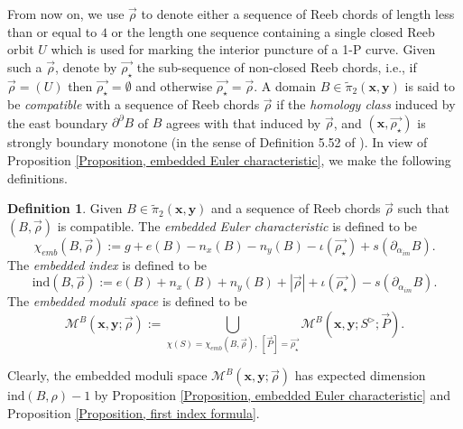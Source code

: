 \documentclass{amsart}
\theoremstyle{definition}
\newtheorem{defn}[thm]{Definition}
\theoremstyle{remark}
\numberwithin{equation}{section}
\numberwithin{equation}{section} \makeatletter
\begin{document}
From now on, we use $\overrightarrow{\rho}$ to denote either a sequence of Reeb chords of length less than or equal to $4$ or the length one sequence containing a single closed Reeb orbit $U$ which is used for marking the interior puncture of a 1-P curve. Given such a $\overrightarrow{\rho}$, denote by $\overrightarrow{{\rho}_{\star}}$ the sub-sequence of non-closed Reeb chords, i.e., if $\overrightarrow{\rho}=(U)$ then $\overrightarrow{{\rho}_{\star}}=\emptyset$ and otherwise $\overrightarrow{{\rho}_{\star}} = \overrightarrow{\rho}$.  
A domain $B\in\tilde{\pi}_2(\bm{x},\bm{y})$ is said to be \emph{compatible} with a sequence of Reeb chords $\overrightarrow{\rho}$ if the \emph{homology class} induced by the east boundary $\partial^\partial B$ of $B$ agrees with that induced by $\overrightarrow{\rho}$, and $(\bm{x},\overrightarrow{{\rho}_{\star}})$ is strongly boundary monotone (in the sense of Definition 5.52 of \cite{LOT18}). In view of Proposition \ref{Proposition, embedded Euler characteristic}, we make the following definitions.
\begin{defn}\label{Definition, embedded Euler Char, index, and moduli space}
Given $B\in \tilde{\pi}_2(\bm{x},\bm{y})$ and a sequence of Reeb chords $\overrightarrow{\rho}$ such that $(B,\overrightarrow{\rho})$ is compatible. The \emph{embedded Euler characteristic} is defined to be $$\chi_{emb}(B,\overrightarrow{\rho}):=g+e(B)-n_x(B)-n_y(B)-\iota(\overrightarrow{{\rho}_{\star}})+s(\partial_{\alpha_{im}}B).$$
The \emph{embedded index} is defined to be $$\text{ind}(B,\overrightarrow{\rho}):=e(B)+n_x(B)+n_y(B)+|\overrightarrow{\rho}|+\iota(\overrightarrow{{\rho}_{\star}})-s(\partial_{\alpha_{im}}B).$$
The \emph{embedded moduli space} is defined to be $$\mathcal{M}^B(\bm{x},\bm{y};\overrightarrow{\rho}):=\bigcup_{\chi(S)=\chi_{emb}(B,\overrightarrow{\rho}),\  [\overrightarrow{P}]=\overrightarrow{{\rho}_{\star}}}\mathcal{M}^B(\bm{x},\bm{y};S^{\triangleright};\overrightarrow{P}).$$
\end{defn}

Clearly, the embedded moduli space $\mathcal{M}^B(\bm{x},\bm{y};\overrightarrow{\rho})$ has expected dimension $\text{ind}(B,\rho)-1$ by Proposition \ref{Proposition, embedded Euler characteristic} and Proposition \ref{Proposition, first index formula}.
\end{document}
